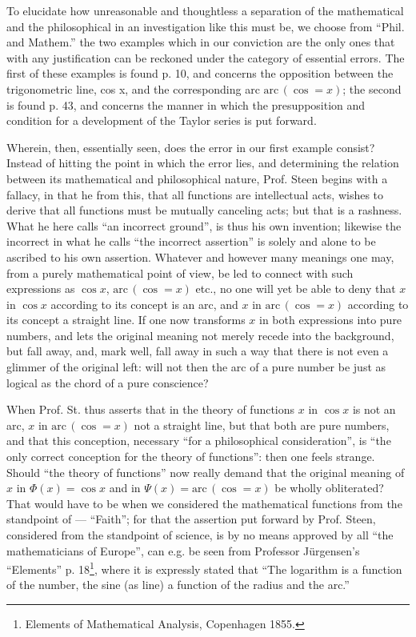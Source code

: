 \documentclass[12pt,a4paper,openany]{book}
\newcommand{\opage}[1]{\marginnote{\footnotesize\textit{[#1]}}}
\begin{document}
\opage{13}\setcounter{footnote}{0}%
To elucidate how unreasonable and thoughtless a separation of
the mathematical and the philosophical in an investigation like
this must be, we choose from ``Phil. and Mathem.'' the two
examples which in our conviction are the only ones that
with any justification can be reckoned under the category of essential
errors. The first of these examples is found p. 10, and concerns the opposition between the trigonometric line, cos x,
and the corresponding arc $\mathrm{arc}\, (\cos = x)$; the second
is found p. 43, and concerns the manner in which the presupposition and condition for a development of the Taylor series
is put forward.

Wherein, then, essentially seen, does the error in our first
example consist? Instead of hitting the point in which the error lies,
and determining the relation between its mathematical and philosophical nature, Prof. Steen begins with
a fallacy, in that he from this, that all functions are
intellectual acts, wishes to derive that all functions
must be mutually canceling acts; but that is a
rashness. What he here calls ``an incorrect ground'', is
thus his own invention; likewise the incorrect in
what he calls ``the incorrect assertion'' is solely and alone to be
ascribed to his own assertion. Whatever and however many meanings one may, from a purely mathematical point of view,
be led to connect with such expressions
as $\cos x$, $\mathrm{arc}\, (\cos = x)$ etc., no one will yet be able to
deny that $x$ in $\cos x$ according to its concept is an arc, and $x$ in
$\mathrm{arc}\, (\cos = x)$ according to its concept a straight line. If one
now transforms $x$ in both expressions into pure numbers, and lets the original meaning not merely recede into the background, but
fall away, and, mark well, fall away in such a way that there
is not even a glimmer of the original left: will not then the arc
of a pure number be just as logical as the chord of a
pure conscience?

When Prof. St. thus asserts that in
\opage{14}\setcounter{footnote}{0}%
the theory of functions $x$ in $\cos x$ is not an arc, $x$ in $\mathrm{arc}\, (\cos = x)$ not a
straight line, but that both are pure numbers, and that this conception, necessary ``for a
philosophical consideration'', is ``the only correct conception
for the theory of functions'': then one feels strange.
Should ``the theory of functions'' now really
demand that the original meaning of $x$ in $\Phi(x)=\cos x$
and in $\Psi(x)=\mathrm{arc}\,(\cos=x)$ be wholly obliterated? That
would have to be when we considered the mathematical functions from the standpoint of --- ``Faith''; for that the assertion put forward by Prof.
Steen, considered from the standpoint of science, is by no means approved by all ``the mathematicians of Europe'', can e.g. be seen from Professor Jürgensen's ``Elements'' p. 18\footnote{Elements of Mathematical Analysis, Copenhagen
1855.}, where it is expressly stated that
``The logarithm is a function of the number, the sine (as line)
a function of the radius and the arc.''
\end{document}
